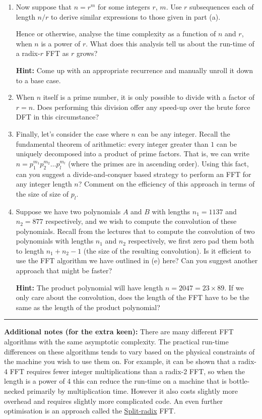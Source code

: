 \documentclass[12pt]{article}
\begin{document}
\begin{question}
\begin{enumerate}
    \item Now suppose that $n = r^m$ for some integers $r$, $m$. Use $r$ subsequences each of length $n/r$ to derive similar expressions to those given in part (a).
    
    Hence or otherwise, analyse the time complexity as a function of $n$ and $r$, when $n$ is a power of $r$. What does this analysis tell us about the run-time of a radix-$r$ FFT as $r$ grows?
    
    {\textbf{Hint:}} Come up with an appropriate recurrence and manually unroll it down to a base case.
    
    \item When $n$ itself is a prime number, it is only possible to divide with a factor of $r = n$. Does performing this division offer any speed-up over the brute force DFT in this circumstance?
    
    \item Finally, let's consider the case where $n$ can be any integer. Recall the fundamental theorem of arithmetic: every integer greater than $1$ can be uniquely decomposed into a product of prime factors. That is, we can write $n = p_1^{m_1}p_2^{m_2}\dots p_l ^{m_l}$ (where the primes are in ascending order). Using this fact, can you suggest a divide-and-conquer based strategy to perform an FFT for any integer length $n$? Comment on the efficiency of this approach in terms of the size of size of $p_l$.
    
    \item Suppose we have two polynomials $A$ and $B$ with lengths $n_1 = 1137$ and $n_2 = 877$ respectively, and we wish to compute the convolution of these polynomials. Recall from the lectures that to compute the convolution of two polynomials with lengths $n_1$ and $n_2$ respectively, we first zero pad them both to length $n_1+n_2-1$ (the size of the resulting convolution). Is it efficient to use the FFT algorithm we have outlined in (e) here? Can you suggest another approach that might be faster?
    
    {\textbf{Hint:}} The product polynomial will have length $n = 2047 = 23\times 89$. If we only care about the convolution, does the length of the FFT have to be the same as the length of the product polynomial?
\end{enumerate}

\rule{\textwidth}{0.25pt}

\textbf{Additional notes (for the extra keen):} There are many different FFT algorithms with the same asymptotic complexity. The practical run-time differences on these algorithms tends to vary based on the physical constraints of the machine you wish to use them on. For example, it can be shown that a radix-4 FFT requires fewer integer multiplications than a radix-2 FFT, so when the length is a power of 4 this can reduce the run-time on a machine that is bottle-necked primarily by multiplication time. However it also costs slightly more overhead and requires slightly more complicated code. An even further optimisation is an approach called the \href{https://en.wikipedia.org/wiki/Split-radix_FFT_algorithm}{Split-radix} FFT.


\end{question}
\end{document}
